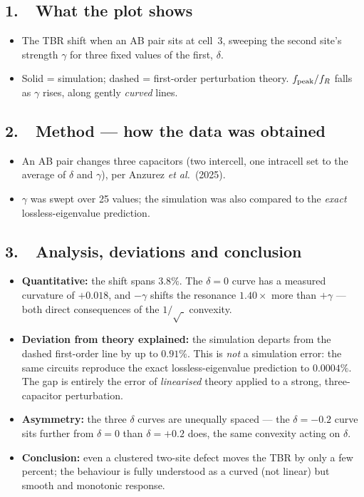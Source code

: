 \documentclass[11pt]{article}
\newcommand{\shows}{\subsection*{\textcolor{accent}{1.\ \ What the plot shows}}\small}
\newcommand{\method}{\subsection*{\textcolor{accent}{2.\ \ Method --- how the data was obtained}}\small}
\newcommand{\analysis}{\subsection*{\textcolor{accent}{3.\ \ Analysis, deviations and conclusion}}\small}
\begin{document}
\shows
\begin{itemize}
\item The TBR shift when an AB pair sits at cell~3, sweeping the second
      site's strength $\gamma$ for three fixed values of the first,
      $\delta$.
\item Solid = simulation; dashed = first-order perturbation theory.
      $f_{\rm peak}/f_R$ falls as $\gamma$ rises, along gently
      \emph{curved} lines.
\end{itemize}

\method
\begin{itemize}
\item An AB pair changes three capacitors (two intercell, one intracell
      set to the average of $\delta$ and $\gamma$), per Anzurez \textit{et
      al.}\ (2025).
\item $\gamma$ was swept over 25 values; the simulation was also compared
      to the \emph{exact} lossless-eigenvalue prediction.
\end{itemize}

\analysis
\begin{itemize}
\item \textbf{Quantitative:} the shift spans $3.8\%$. The
      $\delta=0$ curve has a measured curvature of $+0.018$, and $-\gamma$
      shifts the resonance $1.40\times$ more than $+\gamma$ --- both direct
      consequences of the $1/\sqrt{\;}$ convexity.
\item \textbf{Deviation from theory explained:} the simulation departs
      from the dashed first-order line by up to $0.91\%$. This is
      \emph{not} a simulation error: the same circuits reproduce the exact
      lossless-eigenvalue prediction to $0.0004\%$. The gap is entirely the
      error of \emph{linearised} theory applied to a strong, three-capacitor
      perturbation.
\item \textbf{Asymmetry:} the three $\delta$ curves are unequally
      spaced --- the $\delta=-0.2$ curve sits further from $\delta=0$ than
      $\delta=+0.2$ does, the same convexity acting on $\delta$.
\item \textbf{Conclusion:} even a clustered two-site defect moves the TBR
      by only a few percent; the behaviour is fully understood as a curved
      (not linear) but smooth and monotonic response.
\end{itemize}

\clearpage
\end{document}
